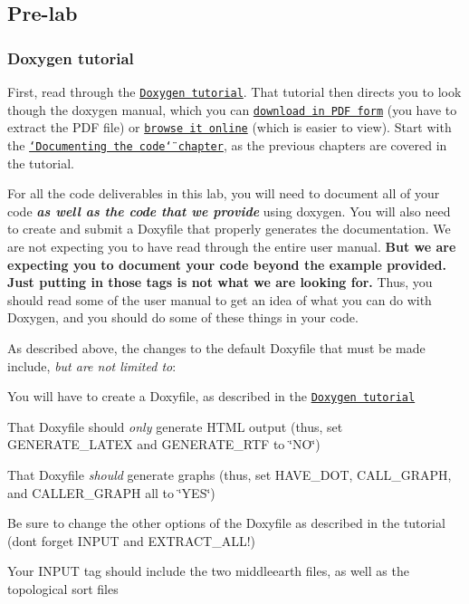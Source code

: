 \subsection*{Pre-\/lab }

\subsubsection*{Doxygen tutorial}

First, read through the \href{../../tutorials/11-doxygen/index.html}{\tt Doxygen tutorial}. That tutorial then directs you to look though the doxygen manual, which you can \href{http://www.stack.nl/~dimitri/doxygen/download.html#dlmanual}{\tt download in P\+DF form} (you have to extract the P\+DF file) or \href{http://www.stack.nl/~dimitri/doxygen/manual/index.html}{\tt browse it online} (which is easier to view). Start with the \href{http://www.stack.nl/~dimitri/doxygen/manual/docblocks.html}{\tt \char`\"{}\+Documenting the code\char`\"{} chapter}, as the previous chapters are covered in the tutorial.

For all the code deliverables in this lab, you will need to document all of your code {\itshape {\bfseries as well as the code that we provide}} using doxygen. You will also need to create and submit a Doxyfile that properly generates the documentation. We are not expecting you to have read through the entire user manual. {\bfseries But we are expecting you to document your code beyond the example provided. Just putting in those tags is not what we are looking for.} Thus, you should read some of the user manual to get an idea of what you can do with Doxygen, and you should do some of these things in your code.

As described above, the changes to the default Doxyfile that must be made include, {\itshape but are not limited to}\+:


\begin{DoxyItemize}
\item You will have to create a Doxyfile, as described in the \href{../../tutorials/11-doxygen/index.html}{\tt Doxygen tutorial}
\item That Doxyfile should {\itshape only} generate H\+T\+ML output (thus, set {\ttfamily G\+E\+N\+E\+R\+A\+T\+E\+\_\+\+L\+A\+T\+EX} and {\ttfamily G\+E\+N\+E\+R\+A\+T\+E\+\_\+\+R\+TF} to \char`\"{}\+N\+O\char`\"{})
\item That Doxyfile {\itshape should} generate graphs (thus, set {\ttfamily H\+A\+V\+E\+\_\+\+D\+OT}, {\ttfamily C\+A\+L\+L\+\_\+\+G\+R\+A\+PH}, and {\ttfamily C\+A\+L\+L\+E\+R\+\_\+\+G\+R\+A\+PH} all to \char`\"{}\+Y\+E\+S\char`\"{})
\item Be sure to change the other options of the Doxyfile as described in the tutorial (don\textquotesingle{}t forget {\ttfamily I\+N\+P\+UT} and {\ttfamily E\+X\+T\+R\+A\+C\+T\+\_\+\+A\+LL}!)
\item Your {\ttfamily I\+N\+P\+UT} tag should include the two middleearth files, as well as the topological sort files
\end{DoxyItemize}

